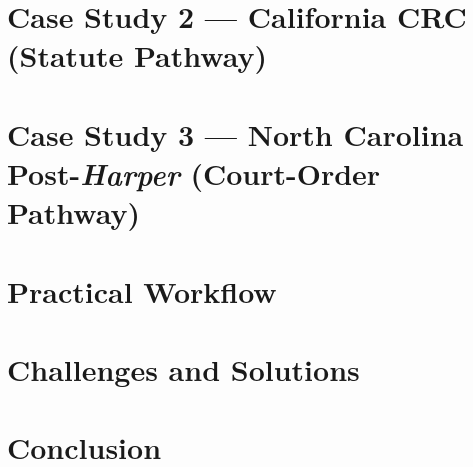 \documentclass[12pt]{article}
\begin{document}
\section{Case Study 2 --- California CRC (Statute Pathway)}


\section{Case Study 3 --- North Carolina Post-\textit{Harper} (Court-Order Pathway)}


\section{Practical Workflow}


\section{Challenges and Solutions}


\section{Conclusion}




\end{document}
